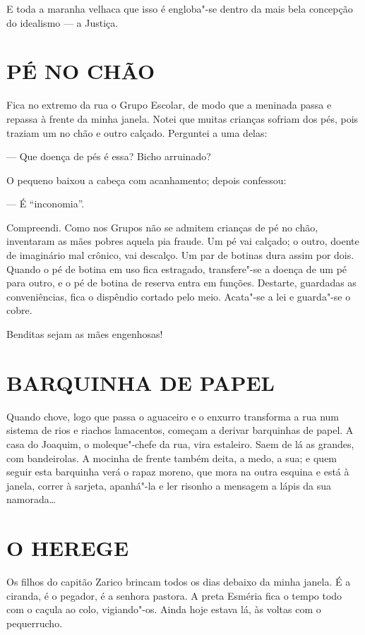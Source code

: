 E toda a maranha velhaca que isso é engloba"-se dentro da mais bela
concepção do idealismo --- a Justiça.

\section*{PÉ NO CHÃO}

Fica no extremo da rua o Grupo Escolar, de modo que a meninada passa e
repassa à frente da minha janela. Notei que muitas crianças sofriam dos
pés, pois traziam um no chão e outro calçado. Perguntei a uma delas:

--- Que doença de pés é essa? Bicho arruinado?

O pequeno baixou a cabeça com acanhamento; depois confessou:

--- É ``inconomia''.

Compreendi. Como nos Grupos não se admitem crianças de pé no chão,
inventaram as mães pobres aquela pia fraude. Um pé vai calçado; o outro,
doente de imaginário mal crônico, vai descalço. Um par de botinas dura
assim por dois. Quando o pé de botina em uso fica estragado,
transfere"-se a doença de um pé para outro, e o pé de botina de reserva
entra em funções. Destarte, guardadas as conveniências, fica o dispêndio
cortado pelo meio. Acata"-se a lei e guarda"-se o cobre.

Benditas sejam as mães engenhosas!

\section*{BARQUINHA DE PAPEL}

Quando chove, logo que passa o aguaceiro e o enxurro transforma a rua
num sistema de rios e riachos lamacentos, começam a derivar barquinhas
de papel. A casa do Joaquim, o moleque"-chefe da rua, vira estaleiro.
Saem de lá as grandes, com bandeirolas. A mocinha de frente também
deita, a medo, a sua; e quem seguir esta barquinha verá o rapaz moreno,
que mora na outra esquina e está à janela, correr à sarjeta, apanhá"-la e
ler risonho a mensagem a lápis da sua namorada\ldots{}

\section*{O HEREGE}

Os filhos do capitão Zarico brincam todos os dias debaixo da minha
janela. É a ciranda, é o pegador, é a senhora pastora. A preta Esméria
fica o tempo todo com o caçula ao colo, vigiando"-os. Ainda hoje estava
lá, às voltas com o pequerrucho.

